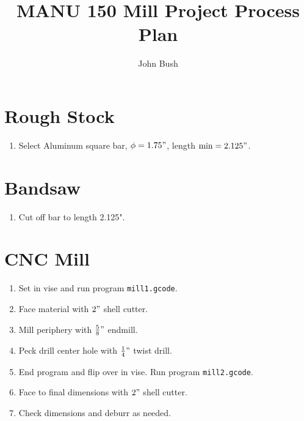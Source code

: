 \documentclass{article}
\begin{document}
\author{John Bush}
\title{MANU 150 Mill Project Process Plan}

\maketitle

\section*{Rough Stock}

\begin{enumerate}
	\item Select Aluminum square bar, $\phi = 1.75"$, length $\text{min} = 2.125"$.
\end{enumerate}

\section*{Bandsaw}

\begin{enumerate}[resume]
	\item Cut off bar to length 2.125".
\end{enumerate}

\section*{CNC Mill}

\begin{enumerate}[resume]
	\item Set in vise and run program \texttt{mill1.gcode}.

	\item Face material with $2"$ shell cutter.

	\item Mill periphery with $\frac{5}{8}"$ endmill.

	\item Peck drill center hole with $\frac{1}{4}"$ twist drill.

	\item End program and flip over in vise.  Run program \texttt{mill2.gcode}.

	\item Face to final dimensions with $2"$ shell cutter.

	\item Check dimensions and deburr as needed.
\end{enumerate}

\newpage
\end{document}
